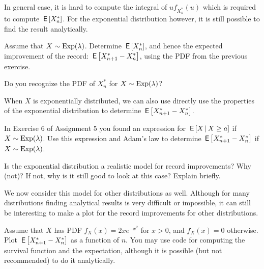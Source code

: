 In general case, it is hard to compute the integral of $u f_{X_n^*}(u)$ which is required to compute $\,\mathsf{E}\left[X_n^*\right]$.
For the exponential distribution however, it is still possible to find the result analytically.

\begin{exercise}
Assume that $X \sim \mathrm{Exp}(\lambda)$. Determine $\,\mathsf{E}\left[X_n^*\right]$, and hence the expected improvement of the record: $\,\mathsf{E}\left[X_{n+1}^* - X_n^*\right]$, using the PDF from the previous exercise.
\begin{hint}
Do you recognize the PDF of $X_n^*$ for $X \sim \mathrm{Exp}(\lambda)$?
\end{hint}
\end{exercise}


When $X$ is exponentially distributed, we can also use directly use the properties of the exponential distribution to determine  $\,\mathsf{E}\left[X_{n+1}^* - X_n^*\right]$.

\begin{exercise}
In Exercise 6 of Assignment 5 you found an expression for $\,\mathsf{E}\left[X \,\middle|\, X \geq a\right]$ if $X \sim \mathrm{Exp}(\lambda)$. Use this expression and Adam's law to determine  $\,\mathsf{E}\left[X_{n+1}^* - X_n^*\right]$  if $X \sim \mathrm{Exp}(\lambda)$.
\end{exercise}

\begin{exercise}
Is the exponential distribution a realistic model for record improvements? Why (not)? If not, why is it still good to look at this case? Explain briefly.
\end{exercise}

We now consider this model for other distributions as well. Although for many distributions finding analytical results is very difficult or impossible, it can still be interesting to make a plot for the record improvements for other distributions.




\begin{exercise}
Assume that $X$ has PDF $f_X(x) = 2xe^{-x^2}$ for $x>0$, and $f_X(x) = 0$ otherwise. Plot $\,\mathsf{E}\left[X_{n+1}^* - X_n^*\right]$ as a function of $n$. You may use code for computing the survival function and the expectation, although it is possible (but not recommended) to do it analytically.
\end{exercise}

